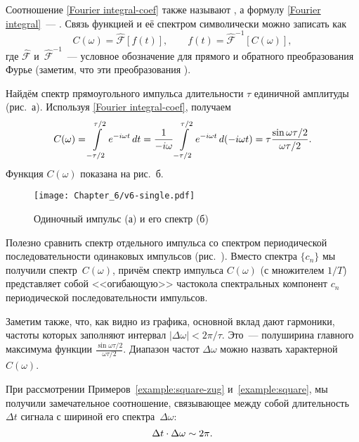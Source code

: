 Соотношение \eqref{Fourier integral-coef} также называют
, а формулу \eqref{Fourier integral}~---
.
Связь функцией и её спектром символически можно записать как
\begin{equation*}
C(\omega) = \hat{\mathcal{F}}[f(t)],\qquad f(t) = \hat{\mathcal{F}}^{-1}[C(\omega)],
\end{equation*}
где $\hat{\mathcal{F}}$ и~$\hat{\mathcal{F}}^{-1}$~--- условное обозначение
для прямого и обратного преобразования Фурье (заметим, что
эти преобразования ).

\begin{lab:example}\label{example:square}
Найдём спектр прямоугольного импульса длительности $\tau$
единичной амплитуды (рис.~а). Используя
\eqref{Fourier integral-coef}, получаем
\begin{equation}
    \eqmark{spectrum-impulse}
    C(\omega)=\int\limits_{-\tau/2}^{\tau/2} e^{-i\omega
t}\,dt=\frac{1}{-i\omega}\int\limits_{-\tau/2}^{\tau/2} e^{-i\omega t}\,
d(-i\omega t)=\tau\frac{\sin\omega\tau/2}{\omega\tau/2}.
\end{equation}
Функция $C(\omega)$ показана на рис.~б.
\begin{figure}[h!]
   \centering\texttt{[image: Chapter\_6/v6-single.pdf]}
    \caption{Одиночный импульс (а) и его спектр (б)}
\end{figure}

Полезно сравнить спектр отдельного импульса со спектром периодической
последовательности одинаковых импульсов (рис.~).
Вместо  спектра $\{c_n\}$ мы получили
 спектр~$C(\omega)$, причём
спектр импульса $C(\omega)$ (с множителем $1/T$) представляет собой
<<огибающую>> частокола спектральных компонент $c_n$
периодической последовательности импульсов.

Заметим также, что, как видно из графика, основной вклад дают гармоники, частоты
которых заполняют интервал $|\Delta\omega|<2\pi/\tau$. Это~--- полуширина
главного максимума функции $\frac{\sin\omega\tau/2}{\omega\tau/2}$. Диапазон
частот $\Delta\omega$ можно назвать характерной 
$C(\omega)$.
\end{lab:example}


\label{sec:indeterminacy}

При рассмотрении Примеров~\ref{example:square-zug} и~\ref{example:square},
мы получили замечательное соотношение, связывающее между собой
длительность~$\Delta t$ сигнала с шириной его спектра~$\Delta \omega$:
\begin{equation}
    \eqmark{indeterminacy relation}
    \Delta t \cdot \Delta\omega \sim 2\pi.
\end{equation}

